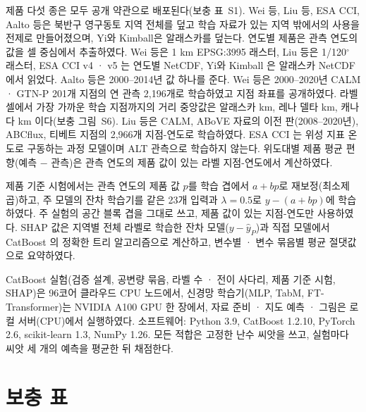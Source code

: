 \documentclass[pdflatex,sn-nature]{sn-jnl}
\begin{document}
제품 다섯 종은 모두 공개 약관으로 배포된다(보충 표~S1). Wei 등\cite{Wei2026}, Liu 등\cite{Liu2024}, ESA CCI\cite{Westermann2024,Westermann2025}, Aalto 등\cite{Aalto2018}은 북반구 영구동토 지역 전체를 덮고 학습 자료가 있는 지역 밖에서의 사용을 전제로 만들어졌으며, Yi와 Kimball\cite{YiKimball2019}은 알래스카를 덮는다. 연도별 제품은 관측 연도의 값을 셀 중심에서 추출하였다. Wei 등은 1 km EPSG:3995 래스터, Liu 등은 1/120$^\circ$ 래스터, ESA CCI v4 · v5 는 연도별 NetCDF, Yi와 Kimball 은 알래스카 NetCDF 에서 읽었다. Aalto 등은 2000--2014년 값 하나를 준다. Wei 등은 2000--2020년 CALM · GTN-P 201개 지점의 연 관측 2,196개로 학습하였고 지점 좌표를 공개하였다. 라벨 셀에서 가장 가까운 학습 지점까지의 거리 중앙값은 알래스카 \ndistweiAkmed{} km, 레나 델타 \ndistweiLemed{} km, 캐나다 \ndistweiCamed{} km 이다(보충 그림~S6). Liu 등은 CALM, ABoVE 자료의 이전 판(2008--2020년), ABCflux, 티베트 지점의 2,966개 지점-연도로 학습하였다. ESA CCI 는 위성 지표 온도로 구동하는 과정 모델이며 ALT 관측으로 학습하지 않는다. 위도대별 제품 평균 편향(예측 − 관측)은 관측 연도의 제품 값이 있는 라벨 지점-연도에서 계산하였다.

제품 기준 시험에서는 관측 연도의 제품 값 $p$를 학습 겹에서 $a+bp$로 재보정(최소제곱)하고, 주 모델의 잔차 학습기를 같은 23개 입력과 $\lambda=0.5$로 $y-(a+bp)$에 학습하였다. 주 실험의 공간 블록 겹을 그대로 쓰고, 제품 값이 있는 지점-연도만 사용하였다. SHAP 값\cite{Lundberg2017}은 지역별 전체 라벨로 학습한 잔차 모델($y-\hat{y}_P$)과 직접 모델에서 CatBoost 의 정확한 트리 알고리즘으로 계산하고, 변수별 · 변수 묶음별 평균 절댓값으로 요약하였다.

CatBoost 실험(검증 설계, 공변량 묶음, 라벨 수 · 전이 사다리, 제품 기준 시험, SHAP)은 96코어 클라우드 CPU 노드에서, 신경망 학습기(MLP, TabM, FT-Transformer)는 NVIDIA A100 GPU 한 장에서, 자료 준비 · 지도 예측 · 그림은 로컬 서버(CPU)에서 실행하였다. 소프트웨어: Python 3.9, CatBoost 1.2.10, PyTorch 2.6, scikit-learn 1.3, NumPy 1.26. 모든 적합은 고정한 난수 씨앗을 쓰고, 실험마다 씨앗 세 개의 예측을 평균한 뒤 채점한다.

\section{보충 표}
\end{document}
